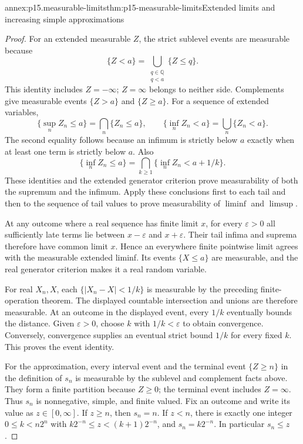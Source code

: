 \begin{annexitem}{annex:p15.measurable-limits}{thm:p15-measurable-limits}{Extended limits and increasing simple approximations}
\begin{proof}
For an extended measurable \(Z\), the strict sublevel events are
measurable because
\[
 \{Z<a\}=\bigcup_{\substack{q\in\mathbb Q\\q<a}}\{Z\leq q\}.
\]
This identity includes \(Z=-\infty\); \(Z=\infty\) belongs to
neither side. Complements give measurable events \(\{Z>a\}\) and
\(\{Z\geq a\}\). For a sequence of extended variables,
\[
 \{\sup_n Z_n\leq a\}=\bigcap_n\{Z_n\leq a\},\qquad
 \{\inf_n Z_n<a\}=\bigcup_n\{Z_n<a\}.
\]
The second equality follows because an infimum is strictly below \(a\)
exactly when at least one term is strictly below \(a\). Also
\[
 \{\inf_n Z_n\leq a\}
     =\bigcap_{k\geq1}\{\inf_n Z_n<a+1/k\}.
\]
These identities and the extended generator criterion prove measurability
of both the supremum and the infimum. Apply these conclusions first to
each tail and then to the sequence of tail values to prove measurability
of \(\liminf\) and \(\limsup\).

At any outcome where a real sequence has finite limit \(x\), for
every \(\varepsilon>0\) all sufficiently late terms lie between
\(x-\varepsilon\) and \(x+\varepsilon\). Their tail infima and
suprema therefore have common limit \(x\). Hence an everywhere finite
pointwise limit agrees with the measurable extended liminf. Its events
\(\{X\leq a\}\) are measurable, and the real generator criterion
makes it a real random variable.

For real \(X_n,X\), each \(\{|X_n-X|<1/k\}\) is measurable by
the preceding finite-operation theorem. The displayed countable
intersection and unions are therefore measurable. At an outcome in the
displayed event, every \(1/k\) eventually bounds the distance. Given
\(\varepsilon>0\), choose \(k\) with \(1/k<\varepsilon\) to
obtain convergence. Conversely, convergence supplies an eventual strict
bound \(1/k\) for every fixed \(k\). This proves the event identity.

For the approximation, every interval event and the terminal event
\(\{Z\geq n\}\) in the definition of \(s_n\) is measurable by
the sublevel and complement facts above. They form a finite partition
because \(Z\geq0\); the terminal event includes \(Z=\infty\).
Thus \(s_n\) is nonnegative, simple, and finite valued. Fix an outcome
and write its value as \(z\in[0,\infty]\). If \(z\geq n\),
then \(s_n=n\). If \(z<n\), there is exactly one integer
\(0\leq k<n2^n\) with \(k2^{-n}\leq z<(k+1)2^{-n}\), and
\(s_n=k2^{-n}\). In particular \(s_n\leq z\).


\end{proof}
\end{annexitem}
